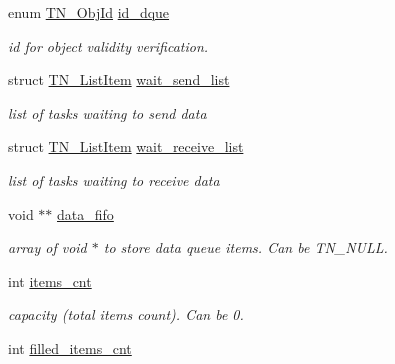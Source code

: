 \begin{DoxyCompactItemize}
\item 
enum \hyperlink{tn__common_8h_ae779dd1f6735f6e139fb70acd004d976}{T\+N\+\_\+\+Obj\+Id} \hyperlink{structTN__DQueue_afce2b73b8afc3b1537e34ff3a4a7114c}{id\+\_\+dque}
\begin{DoxyCompactList}\small\item\em id for object validity verification. \end{DoxyCompactList}\item 
\hypertarget{structTN__DQueue_a5094327a117b22df9d3b09ee45204c62}{struct \hyperlink{structTN__ListItem}{T\+N\+\_\+\+List\+Item} \hyperlink{structTN__DQueue_a5094327a117b22df9d3b09ee45204c62}{wait\+\_\+send\+\_\+list}}\label{structTN__DQueue_a5094327a117b22df9d3b09ee45204c62}

\begin{DoxyCompactList}\small\item\em list of tasks waiting to send data \end{DoxyCompactList}\item 
\hypertarget{structTN__DQueue_a2cb2cfdd31937d5d121a72b4e2ee6f1b}{struct \hyperlink{structTN__ListItem}{T\+N\+\_\+\+List\+Item} \hyperlink{structTN__DQueue_a2cb2cfdd31937d5d121a72b4e2ee6f1b}{wait\+\_\+receive\+\_\+list}}\label{structTN__DQueue_a2cb2cfdd31937d5d121a72b4e2ee6f1b}

\begin{DoxyCompactList}\small\item\em list of tasks waiting to receive data \end{DoxyCompactList}\item 
\hypertarget{structTN__DQueue_aba382885049d3df6ed8dbb8736ced1ad}{void $\ast$$\ast$ \hyperlink{structTN__DQueue_aba382885049d3df6ed8dbb8736ced1ad}{data\+\_\+fifo}}\label{structTN__DQueue_aba382885049d3df6ed8dbb8736ced1ad}

\begin{DoxyCompactList}\small\item\em array of {\ttfamily void $\ast$} to store data queue items. Can be {\ttfamily T\+N\+\_\+\+N\+U\+L\+L}. \end{DoxyCompactList}\item 
\hypertarget{structTN__DQueue_a1c0167117cef4412bbbac2aff3334e7b}{int \hyperlink{structTN__DQueue_a1c0167117cef4412bbbac2aff3334e7b}{items\+\_\+cnt}}\label{structTN__DQueue_a1c0167117cef4412bbbac2aff3334e7b}

\begin{DoxyCompactList}\small\item\em capacity (total items count). Can be 0. \end{DoxyCompactList}\item 
\hypertarget{structTN__DQueue_a536190a17aff0355de36d8d68aa7d98c}{int \hyperlink{structTN__DQueue_a536190a17aff0355de36d8d68aa7d98c}{filled\+\_\+items\+\_\+cnt}}\label{structTN__DQueue_a536190a17aff0355de36d8d68aa7d98c}


\end{DoxyCompactItemize}
